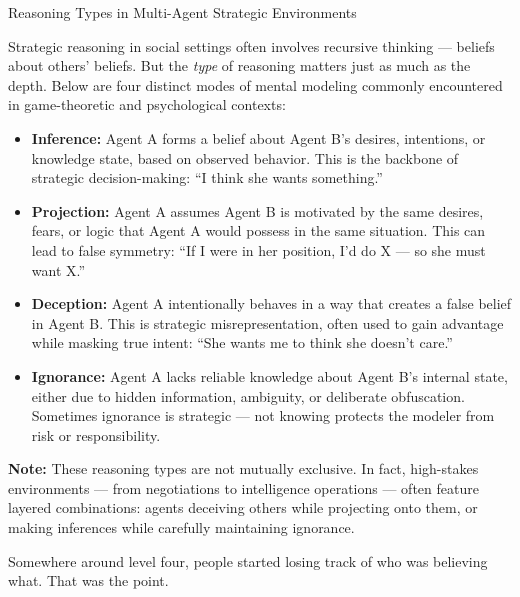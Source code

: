 \begin{TechnicalSidebar}{Reasoning Types in Multi-Agent Strategic Environments}

    Strategic reasoning in social settings often involves recursive thinking — beliefs about others' beliefs. But the \emph{type} of reasoning matters just as much as the depth. Below are four distinct modes of mental modeling commonly encountered in game-theoretic and psychological contexts:
    
    \medskip

    \begin{itemize}
    
        \item \textbf{Inference:} Agent A forms a belief about Agent B’s desires, intentions, or knowledge state, based on observed behavior. This is the backbone of strategic decision-making: “I think she wants something.”
        \item \textbf{Projection:} Agent A assumes Agent B is motivated by the same desires, fears, or logic that Agent A would possess in the same situation. This can lead to false symmetry: “If I were in her position, I’d do X — so she must want X.”
        \item \textbf{Deception:} Agent A intentionally behaves in a way that creates a false belief in Agent B. This is strategic misrepresentation, often used to gain advantage while masking true intent: “She wants me to think she doesn’t care.”
        \item \textbf{Ignorance:} Agent A lacks reliable knowledge about Agent B’s internal state, either due to hidden information, ambiguity, or deliberate obfuscation. Sometimes ignorance is strategic — not knowing protects the modeler from risk or responsibility.
    
    \end{itemize}
    
    \medskip
    
    \textbf{Note:} These reasoning types are not mutually exclusive. In fact, high-stakes environments — from negotiations to intelligence operations — often feature layered combinations: agents deceiving others while projecting onto them, or making inferences while carefully maintaining ignorance.
    
\end{TechnicalSidebar}


Somewhere around level four, people started losing track of who was believing what.
That was the point.

